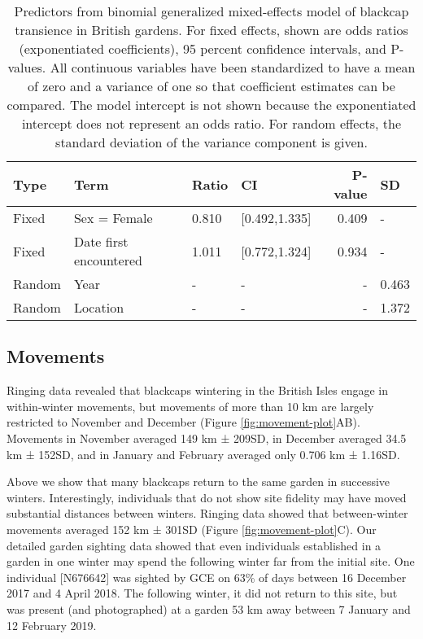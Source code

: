 \documentclass[a4paper, nobind]{templates/ociamthesis}
\begin{document}
\begin{table}[t]

\caption{\label{tab:transience-model-table}Predictors from binomial generalized mixed-effects model of blackcap transience in British gardens. For fixed effects, shown are odds ratios (exponentiated coefficients), 95 percent confidence intervals, and P-values. All continuous variables have been standardized to have a mean of zero and a variance of one so that coefficient estimates can be compared. The model intercept is not shown because the exponentiated intercept does not represent an odds ratio. For random effects, the standard deviation of the variance component is given.}
\centering
\fontsize{9.5}{11.5}\selectfont
\begin{tabular}{l|l|l|l|r|l}
\hline
Type & Term & Ratio & CI & P-value & SD\\
\hline
Fixed & Sex = Female & 0.810 & [0.492,1.335] & 0.409 & -\\
\hline
Fixed & Date first encountered & 1.011 & [0.772,1.324] & 0.934 & -\\
\hline
Random & Year & - & - & - & 0.463\\
\hline
Random & Location & - & - & - & 1.372\\
\hline
\end{tabular}
\end{table}

\hypertarget{movements-1}{%
\subsection{Movements}\label{movements-1}}

Ringing data revealed that blackcaps wintering in the British Isles engage in within-winter movements, but movements of more than 10 km are largely restricted to November and December (Figure \ref{fig:movement-plot}AB). Movements in November averaged 149 km ± 209SD, in December averaged 34.5 km ± 152SD, and in January and February averaged only 0.706 km ± 1.16SD.

Above we show that many blackcaps return to the same garden in successive winters. Interestingly, individuals that do not show site fidelity may have moved substantial distances between winters. Ringing data showed that between-winter movements averaged 152 km ± 301SD (Figure \ref{fig:movement-plot}C). Our detailed garden sighting data showed that even individuals established in a garden in one winter may spend the following winter far from the initial site. One individual {[}N676642{]} was sighted by GCE on 63\% of days between 16 December 2017 and 4 April 2018. The following winter, it did not return to this site, but was present (and photographed) at a garden 53 km away between 7 January and 12 February 2019.
\end{document}
